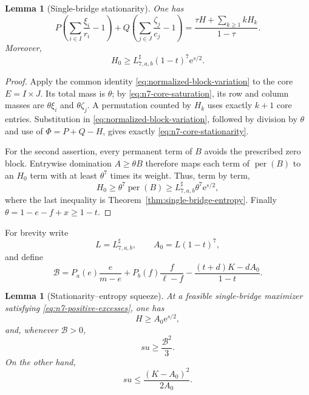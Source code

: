 \documentclass[11pt,a4paper]{article}
\numberwithin{equation}{section}
\newtheorem{lemma}[theorem]{Lemma}
\theoremstyle{definition}
\newcommand{\per}{\operatorname{per}}
\newcommand{\1}{\mathbf{1}}
\newcommand{\e}{\mathrm{e}}
\begin{document}
\begin{lemma}[Single-bridge stationarity]\label{lem:n7-core-stationarity}
One has
\begin{equation}\label{eq:n7-core-stationarity}
 P\left(\sum_{i\in I}\frac{\xi_i}{r_i}-1\right)
 +Q\left(\sum_{j\in J}\frac{\zeta_j}{c_j}-1\right)
 =\frac{\tau H+\sum_{k\ge1}kH_k}{1-\tau}.
\end{equation}
Moreover,
\begin{equation}\label{eq:n7-H0-entropy}
 H_0\ge
 L^{\sharp}_{7,a,b}(1-t)^7\e^{s/2}.
\end{equation}
\end{lemma}

\begin{proof}
Apply the common identity \eqref{eq:normalized-block-variation} to the core
$E=I\times J$.  Its total mass is $\theta$; by
\eqref{eq:n7-core-saturation}, its row and column masses are
$\theta\xi_i$ and $\theta\zeta_j$.  A permutation counted by $H_k$ uses
exactly $k+1$ core entries.  Substitution in
\eqref{eq:normalized-block-variation}, followed by division by $\theta$ and
use of $\Phi=P+Q-H$, gives exactly
\eqref{eq:n7-core-stationarity}.

For the second assertion, every permanent term of $B$ avoids the prescribed
zero block.  Entrywise domination $A\ge\theta B$ therefore maps each term of
$\per(B)$ to an $H_0$ term with at least $\theta^7$ times its weight.  Thus,
term by term,
\[
 H_0\ge \theta^7\per(B)
 \ge L^{\sharp}_{7,a,b}\theta^7\e^{s/2},
\]
where the last inequality is
Theorem~\ref{thm:single-bridge-entropy}.  Finally
$\theta=1-e-f+x\ge1-t$.
\end{proof}

For brevity write
\begin{equation}\label{eq:n7-A0}
 L=L^{\sharp}_{7,a,b},
 \qquad
 A_0=L(1-t)^7,
\end{equation}
and define
\begin{equation}\label{eq:n7-Bcal}
 \mathcal B=
 P_a(e)\frac{e}{m-e}
 +P_b(f)\frac{f}{\ell-f}
 -\frac{(t+d)K-dA_0}{1-t}.
\end{equation}

\begin{lemma}[Stationarity--entropy squeeze]\label{lem:n7-squeeze}
At a feasible single-bridge maximizer satisfying
\eqref{eq:n7-positive-excesses}, one has
\begin{equation}\label{eq:n7-entropy-lower}
 H\ge A_0\e^{s/2},
\end{equation}
and, whenever $\mathcal B>0$,
\begin{equation}\label{eq:n7-su-lower}
 su\ge\frac{\mathcal B^2}{3}.
\end{equation}
On the other hand,
\begin{equation}\label{eq:n7-su-upper}
 su\le\frac{(K-A_0)^2}{2A_0}.
\end{equation}
\end{lemma}
\end{document}
